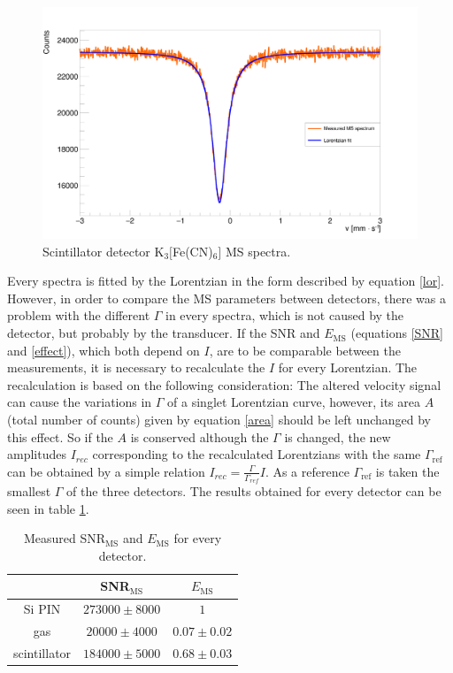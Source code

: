 \begin{figure}[H]
\centering
\includegraphics[scale=0.125, angle = 0]{./pictures/MossPMT.png}
\caption{Scintillator detector K$_{3}[$Fe(CN)$_{6}]$ MS spectra.}
\label{Scintillator detector MS spectra.}

\end{figure}


Every spectra is fitted by the Lorentzian in the form described by equation \ref{lor}. However, in order to compare the MS parameters between detectors, there was a problem with the different $\Gamma$ in every spectra, which is not caused by the detector, but probably by the transducer. If the SNR and $E_{\textrm{MS}}$ (equations \ref{SNR} and \ref{effect}), which both depend on $I$, are to be comparable between the measurements, it is necessary to recalculate the $I$ for every Lorentzian. The recalculation is based on the following consideration: The altered velocity signal can cause the variations in $\Gamma$ of a singlet Lorentzian curve, however, its area $A$ (total number of counts) given by equation \ref{area} should be left unchanged by this effect. So if the $A$ is conserved although the $\Gamma$ is changed, the new amplitudes $I_{rec}$ corresponding to the recalculated Lorentzians with the same $\Gamma_{\textrm{ref}}$  can be obtained by a simple relation $I_{rec} = \frac{\Gamma}{\Gamma_{ref}}I$. As a reference $\Gamma_{\textrm{ref}}$ is taken the smallest $\Gamma$ of the three detectors.
The results obtained for every detector can be seen in table \ref{mossres}.

\begin{table}[H]
\centering
\begin{tabular}{|c|c|c|}
\hline
   & SNR$_{\textrm{MS}}$ & $E_{\textrm{MS}}$ \\ \hline
Si PIN & $273000 \pm 8000$    & $1$  \\ \hline
gas & $20000 \pm 4000$    & $0.07 \pm 0.02$ \\ \hline
scintillator  & $184000 \pm 5000$    & $0.68 \pm 0.03$ \\ \hline
\end{tabular}
\caption{Measured SNR$_{\textrm{MS}}$ and $E_{\textrm{MS}}$ for every detector.}
 \label{mossres}
\end{table}

